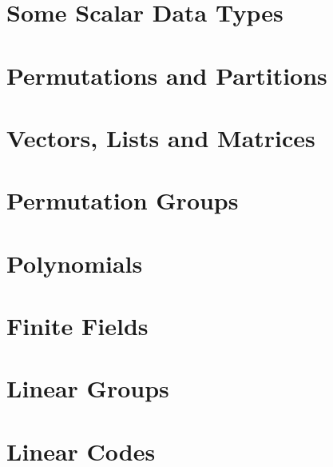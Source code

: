 \documentclass[10pt,a4paper]{book}
\begin{document}
{\chapter{Some Scalar Data Types}


\chapter{Permutations and Partitions}




\chapter{Vectors, Lists and Matrices}



\chapter{Permutation Groups}






\chapter{Polynomials}




\chapter{Finite Fields}






\chapter{Linear Groups}






%

\chapter{Linear Codes}



}
\end{document}
